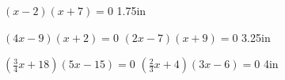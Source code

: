 {
    \centering
    $(x-2)(x+7) = 0$
}
{1.75in}


\myProblems
{
    \centering
    $(4x-9)(x+2) = 0$
}
{
    \centering
    $(2x-7)(x+9) = 0$
}
{3.25in}

\myProblems
{
    \centering
    $(\frac{3}{4}x+18)(5x-15) = 0$
}
{
    \centering
    $(\frac{2}{3}x+4)(3x-6) = 0$
}
{4in}